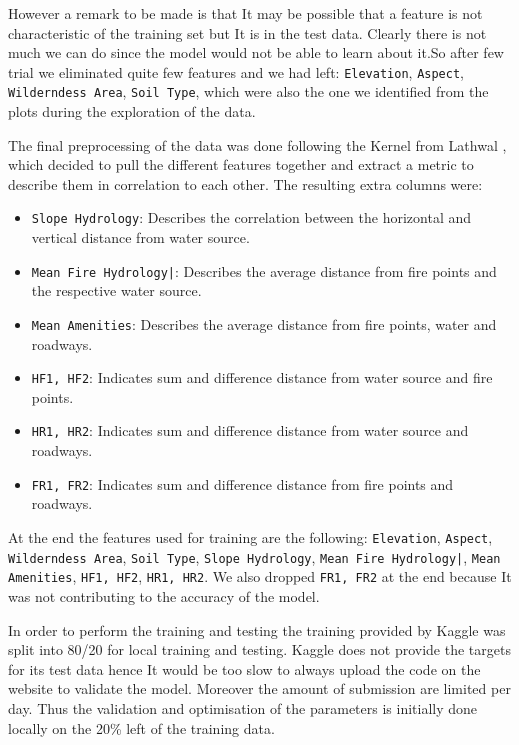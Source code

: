 \documentclass[a4paper, 11pt]{article}
\begin{document}
However a remark to be made is that It may be possible that a feature is not characteristic of the training set but It is in the test data. Clearly there is not much we can do since the model would not be able to learn about it.So after few trial we eliminated quite few features and we had left: \texttt{Elevation}, \texttt{Aspect}, \texttt{Wilderndess Area}, \texttt{Soil Type}, which were also the one we identified from the plots during the exploration of the data.

The final preprocessing of the data was done following the Kernel from Lathwal \cite{code}, which decided to pull the different features together and extract a metric to describe them in correlation to each other. The resulting extra columns were: 
\begin{itemize}
  \item \texttt{Slope Hydrology}: Describes the correlation between the horizontal and vertical distance from water source.
  \item \texttt{Mean Fire Hydrology|}: Describes the average distance from fire points and the respective water source.
  \item \texttt{Mean Amenities}: Describes the average distance from fire points, water and roadways.
  \item \texttt{HF1, HF2}: Indicates sum and difference distance from water source and fire points.
  \item \texttt{HR1, HR2}: Indicates sum and difference distance from water source and roadways.
  \item \texttt{FR1, FR2}: Indicates sum and difference distance from fire points and roadways.
\end{itemize}
At the end the features used for training are the following:  \texttt{Elevation}, \texttt{Aspect}, \texttt{Wilderndess Area}, \texttt{Soil Type}, \texttt{Slope Hydrology}, \texttt{Mean Fire Hydrology|}, \texttt{Mean Amenities},  \texttt{HF1, HF2}, \texttt{HR1, HR2}. We also dropped \texttt{FR1, FR2} at the end because It was not contributing to the accuracy of the model.

In order to perform the training and testing the training provided by Kaggle was split into 80/20 for local training and testing. Kaggle does not provide the targets for its test data hence It would be too slow to always upload the code on the website to validate the model. Moreover the amount of submission are limited per day. Thus the validation and optimisation of the parameters is initially done locally on the 20\% left of the training data.
\end{document}
